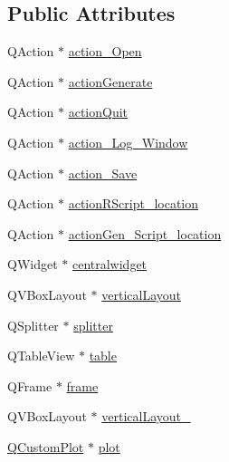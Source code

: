 \subsection*{Public Attributes}
\begin{DoxyCompactItemize}
\item 
Q\+Action $\ast$ \mbox{\hyperlink{class_ui___ts_editor_window_a3b4c6e70f1a4733b6c74665f3e8d5ded}{action\+\_\+\+Open}}
\item 
Q\+Action $\ast$ \mbox{\hyperlink{class_ui___ts_editor_window_a08b4c184a09dfa61bb3481472c6861d7}{action\+Generate}}
\item 
Q\+Action $\ast$ \mbox{\hyperlink{class_ui___ts_editor_window_a550a77eeb5dddabeee94b779d38af803}{action\+Quit}}
\item 
Q\+Action $\ast$ \mbox{\hyperlink{class_ui___ts_editor_window_a2956489a37d32065dc0b651e4b98c935}{action\+\_\+\+Log\+\_\+\+Window}}
\item 
Q\+Action $\ast$ \mbox{\hyperlink{class_ui___ts_editor_window_acc295364c5dec93ffb23731c453093f7}{action\+\_\+\+Save}}
\item 
Q\+Action $\ast$ \mbox{\hyperlink{class_ui___ts_editor_window_a60ae597cbe3d820f4264be89487e3f79}{action\+R\+Script\+\_\+location}}
\item 
Q\+Action $\ast$ \mbox{\hyperlink{class_ui___ts_editor_window_a94a5adcb6f4499829dcfec48cb9f4f5e}{action\+Gen\+\_\+\+Script\+\_\+location}}
\item 
Q\+Widget $\ast$ \mbox{\hyperlink{class_ui___ts_editor_window_a106cb9a845c0147071f294a50125b770}{centralwidget}}
\item 
Q\+V\+Box\+Layout $\ast$ \mbox{\hyperlink{class_ui___ts_editor_window_a6c35110dc5e1a4cfd3e8ddff7f73d608}{vertical\+Layout}}
\item 
Q\+Splitter $\ast$ \mbox{\hyperlink{class_ui___ts_editor_window_af154455f05a0b74abfd7cf09d1e622a6}{splitter}}
\item 
Q\+Table\+View $\ast$ \mbox{\hyperlink{class_ui___ts_editor_window_a2f8f43c798773648d85ba3f7e157b65e}{table}}
\item 
Q\+Frame $\ast$ \mbox{\hyperlink{class_ui___ts_editor_window_a32b33947549a399ff7752dcaf2782e63}{frame}}
\item 
Q\+V\+Box\+Layout $\ast$ \mbox{\hyperlink{class_ui___ts_editor_window_a76c51335a6ee151d84323a736cb136c3}{vertical\+Layout\+\_}}
\item 
\mbox{\hyperlink{class_q_custom_plot}{Q\+Custom\+Plot}} $\ast$ \mbox{\hyperlink{class_ui___ts_editor_window_a011a00f431f21dcf407a94856081c5cc}{plot}}

\end{DoxyCompactItemize}
